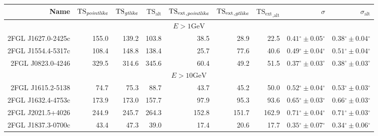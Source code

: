 \documentclass[12pt,preprint]{aastex}
\newcommand{\gev}{\text{GeV}\xspace}
\newcommand{\tsext}{{\ensuremath{\text{TS}_\text{ext}}}\xspace}
\newcommand{\tsextpointlike}{\ensuremath{\tsext_{,\pointlike}}\xspace}
\newcommand{\tsextgtlike}{\ensuremath{\tsext_{,\gtlike}}\xspace}
\newcommand{\tsextalt}{\ensuremath{\tsext_{,\alt}}\xspace}
\newcommand{\ts}{\text{TS}\xspace}
\newcommand{\alt}{\text{alt}\xspace}
\renewcommand{\deg}{\ensuremath{^\circ}\xspace}
\newcommand{\pointlike}{\text{\em pointlike}\xspace}
\newcommand{\gtlike}{\text{\em gtlike}\xspace}
\begin{document}
  \clearpage
  \begin{table}
    \begin{centering}
      \begin{tabular}{r|rrrrrrrr}
        \hline
        \hline
        Name                 &     $\ts_\pointlike$ &        $\ts_\gtlike$ &           $\ts_\alt$ &          \tsextpointlike &           \tsextgtlike &            \tsextalt &                    $\sigma$ &               $\sigma_\alt$ \\
        \hline
        \multicolumn{9}{c}{$E > 1\gev$} \\
        \hline
        2FGL J1627.0-2425c   &                155.0 &                139.2 &                103.8 &                     38.5 &                   28.9 &                 22.5 & $  0.41\deg \pm   0.05\deg$ & $  0.38\deg \pm   0.04\deg$ \\
        2FGL J1554.4-5317c   &                108.4 &                148.8 &                138.4 &                     25.7 &                   77.6 &                 40.6 & $  0.49\deg \pm   0.04\deg$ & $  0.51\deg \pm   0.04\deg$ \\
        2FGL J0823.0-4246    &                329.5 &                314.6 &                345.6 &                     60.4 &                   49.2 &                 51.5 & $  0.37\deg \pm   0.03\deg$ & $  0.38\deg \pm   0.03\deg$ \\
        \hline
        \multicolumn{9}{c}{$E > 10\gev$} \\
        \hline
        2FGL J1615.2-5138    &                 74.7 &                 75.3 &                 88.7 &                     43.7 &                   45.2 &                 50.0 & $  0.52\deg \pm   0.04\deg$ & $  0.53\deg \pm   0.03\deg$ \\
        2FGL J1632.4-4753c   &                173.9 &                173.0 &                157.7 &                     97.9 &                   95.3 &                 93.6 & $  0.65\deg \pm   0.03\deg$ & $  0.66\deg \pm   0.03\deg$ \\
        2FGL J2021.5+4026    &                244.9 &                245.7 &                264.3 &                    152.8 &                  151.7 &                162.9 & $  0.71\deg \pm   0.04\deg$ & $  0.71\deg \pm   0.03\deg$ \\
        2FGL J1837.3-0700c   &                 43.4 &                 47.3 &                 39.0 &                     17.4 &                   20.6 &                 17.7 & $  0.35\deg \pm   0.07\deg$ & $  0.34\deg \pm   0.06\deg$ \\

\end{tabular}
\end{centering}
\end{table}
\end{document}
